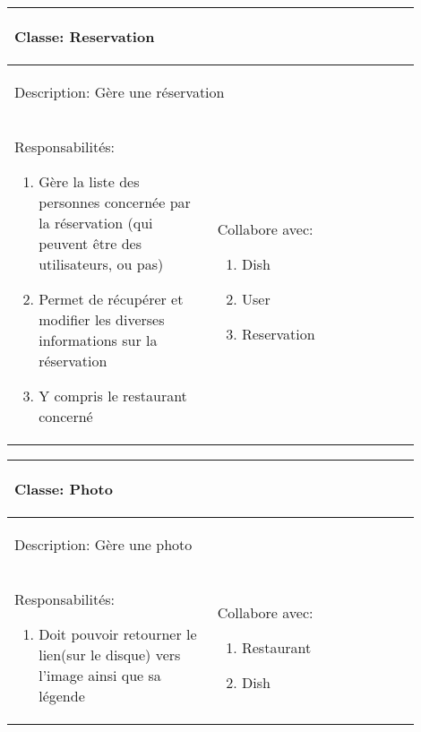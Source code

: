 \documentclass[10pt,a4paper]{article}
\begin{document}
\begin{tabular}{|p{0.45\linewidth}|p{0.45\linewidth}|}
  \hline
  \multicolumn{2}{|l|}{\begin{large}
  	Classe: Reservation
  \end{large}}\\
  \hline
  \multicolumn{2}{|l|}{\begin{normalsize}
  	Description: Gère une réservation
  \end{normalsize}}\\[0.05\linewidth]
  \hline
  \begin{normalsize}
  	Responsabilités:
  	\begin{enumerate}
  		\item Gère la liste des personnes concernée par la réservation (qui peuvent être des utilisateurs, ou pas)
  		\item Permet de récupérer et modifier les diverses informations sur la réservation
  		\item Y compris le restaurant concerné
  	\end{enumerate}
  \end{normalsize} & 
  \begin{normalsize}{
  	Collabore avec:
  	\begin{enumerate}
  		\item Dish
    		\item User
    		\item Reservation
  	\end{enumerate}
  }\end{normalsize}\\[0.6\linewidth]
  \hline
\end{tabular}

\begin{tabular}{|p{0.45\linewidth}|p{0.45\linewidth}|}
  \hline
  \multicolumn{2}{|l|}{\begin{large}
  	Classe: Photo
  \end{large}}\\
  \hline
  \multicolumn{2}{|l|}{\begin{normalsize}
  	Description: Gère une photo
  \end{normalsize}}\\[0.05\linewidth]
  \hline
  \begin{normalsize}
  	Responsabilités:
  	\begin{enumerate}
  		\item Doit pouvoir retourner le lien(sur le disque) vers l'image ainsi que sa légende
  	\end{enumerate}
  \end{normalsize} & 
  \begin{normalsize}{
  	Collabore avec:
  	\begin{enumerate}
  		\item Restaurant
  		\item Dish
  	\end{enumerate}
  }\end{normalsize}\\[0.6\linewidth]
  \hline
\end{tabular}
\end{document}
